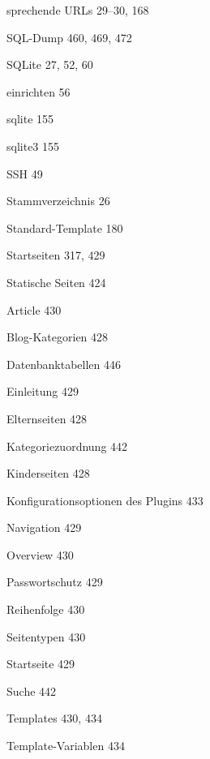 \documentclass{book}
\renewcommand\subitem{\par}
\begin{document}
\begin{multicols}{2}
\begin{osp-index}
  \item sprechende URLs\hspace{1mm} 29--30, 168
  \item SQL-Dump\hspace{1mm} 460, 469, 472
  \item SQLite\hspace{1mm} 27, 52, 60
    \subitem einrichten\hspace{1mm} 56
  \item sqlite\hspace{1mm} 155
  \item sqlite3\hspace{1mm} 155
  \item SSH\hspace{1mm} 49
  \item Stammverzeichnis\hspace{1mm} 26
  \item Standard-Template\hspace{1mm} 180
  \item Startseiten\hspace{1mm} 317, 429
  \item Statische Seiten\hspace{1mm} 424
    \subitem Article\hspace{1mm} 430
    \subitem Blog-Kategorien\hspace{1mm} 428
    \subitem Datenbanktabellen\hspace{1mm} 446
    \subitem Einleitung\hspace{1mm} 429
    \subitem Elternseiten\hspace{1mm} 428
    \subitem Kategoriezuordnung\hspace{1mm} 442
    \subitem Kinderseiten\hspace{1mm} 428
    \subitem Konfigurationsoptionen des Plugins\hspace{1mm} 433
    \subitem Navigation\hspace{1mm} 429
    \subitem Overview\hspace{1mm} 430
    \subitem Passwortschutz\hspace{1mm} 429
    \subitem Reihenfolge\hspace{1mm} 430
    \subitem Seitentypen\hspace{1mm} 430
    \subitem Startseite\hspace{1mm} 429
    \subitem Suche\hspace{1mm} 442
    \subitem Templates\hspace{1mm} 430, 434
    \subitem Template-Variablen\hspace{1mm} 434

\end{osp-index}
\end{multicols}
\end{document}
